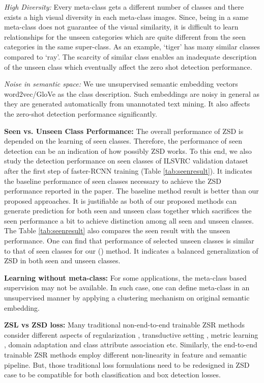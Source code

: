 \documentclass[runningheads]{llncs}
\begin{document}
\textit{High Diversity:} Every meta-class gets a different number of classes and there exists a high visual diversity in each meta-class images. Since, being in a same meta-class does not guarantee of the visual similarity, it is difficult to learn relationships for the unseen categories which are quite different from the seen categories in the same super-class. As an example, `tiger' has many similar classes compared to `ray'. The scarcity of similar class enables an inadequate description of the unseen class which eventually affect the zero shot detection performance.

\textit{Noise in semantic space:} We use unsupervised semantic embedding vectors word2vec/GloVe as the class description. Such embeddings are noisy in general as they are generated automatically from unannotated text mining. It also affects the zero-shot detection performance significantly.


\textbf{Seen vs. Unseen Class Performance:} The overall performance of ZSD is depended on the learning of seen classes. Therefore, the performance of seen detection can be an indication of how possibly ZSD works. To this end, we also study the detection performance on seen classes of ILSVRC validation dataset after the first step of faster-RCNN training (Table \ref{tab:seenresult}). It indicates the baseline performance of seen classes necessary to achieve the ZSD performance reported in the paper. The baseline method result is better than our proposed approaches. It is justifiable as both of our proposed methods can generate prediction for both seen and unseen class together which sacrifices the seen performance a bit to achieve distinction among all seen and unseen classes. The Table \ref{tab:seenresult} also compares the seen result with the unseen performance. One can find that performance of selected unseen classes is similar to that of seen classes for our () method. It indicates a balanced generalization of ZSD in both seen and unseen classes.

\textbf{Learning without meta-class:} For some applications, the meta-class based supervision may not be available. In such case, one can define meta-class in an unsupervised manner by applying a clustering mechanism on original semantic embedding.


\textbf{ZSL vs ZSD loss:} Many traditional non-end-to-end trainable ZSR methods consider different aspects of regularization \cite{Morgado_2017_CVPR}, transductive setting \cite{Li_2017_CVPR}, metric learning \cite{bucher_ECCV_2016}, domain adaptation \cite{Kodirov_2015_ICCV} and class attribute association \cite{Al-Halah_2016_CVPR} etc. Similarly, the end-to-end trainable ZSR methods \cite{Zhang_2017_CVPR,Ba_CVPR_2015} employ different non-linearity in feature and semantic pipeline. But, those traditional loss formulations need to be redesigned in ZSD case to be compatible for both classification and box detection losses.
\end{document}
